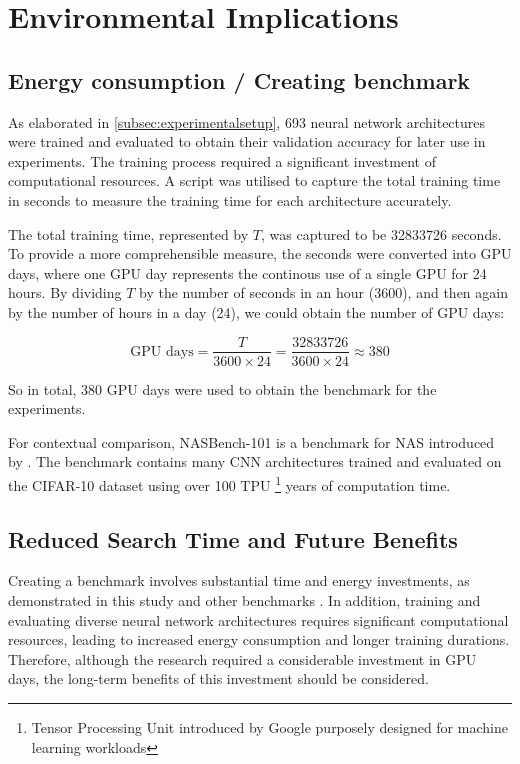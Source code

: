 \section{Environmental Implications}
\subsection{Energy consumption / Creating benchmark}

As elaborated in \cref{subsec:experimentalsetup}, 693 neural network architectures were trained and evaluated to obtain their validation accuracy for later use in experiments. The training process required a significant investment of computational resources. A script was utilised to capture the total training time in seconds to measure the training time for each architecture accurately.

The total training time, represented by $T$, was captured to be 32833726 seconds. To provide a more comprehensible measure, the seconds were converted into \gls{GPU} days, where one \gls{GPU} day represents the continous use of a single \gls{GPU} for 24 hours. By dividing $T$ by the number of seconds in an hour (3600), and then again by the number of hours in a day (24), we could obtain the number of \gls{GPU} days:

\begin{equation*}
    \text{GPU days} = \frac{T}{3600 \times 24} = \frac{32833726}{3600 \times 24 } \approx 380
\end{equation*}

So in total, 380 \gls{GPU} days were used to obtain the benchmark for the experiments. 

For contextual comparison, NASBench-101 is a benchmark for \gls{NAS} introduced by \autocite{ying2019bench}. The benchmark contains many \gls{CNN} architectures trained and evaluated on the CIFAR-10 dataset using over 100 TPU \footnote{Tensor Processing Unit introduced by Google purposely designed for machine learning workloads} years of computation time. 

\subsection{Reduced Search Time and Future Benefits}

Creating a benchmark involves substantial time and energy investments, as demonstrated in this study and other benchmarks \autocite{dong2020bench, ying2019bench, tu2021bench}. In addition, training and evaluating diverse neural network architectures requires significant computational resources, leading to increased energy consumption and longer training durations. Therefore, although the research required a considerable investment in \gls{GPU} days, the long-term benefits of this investment should be considered. 

